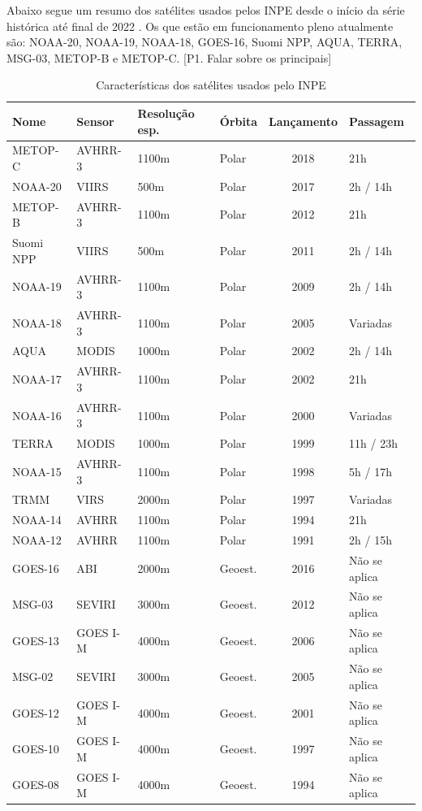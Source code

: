 \documentclass[cic,tc]{iiufrgs}
\begin{document}
Abaixo segue um resumo dos satélites usados pelos INPE desde  o início da 
série histórica até final de 2022 \cite{EmbrapaSatelites}. 
Os que estão em funcionamento pleno atualmente são:
NOAA-20, NOAA-19, NOAA-18, GOES-16, Suomi NPP, AQUA, TERRA, MSG-03, 
METOP-B e METOP-C. [P1. Falar sobre os principais]\par

\begin{table}[htbp]
\centering
\caption{Características dos satélites usados pelo INPE}
\begin{tabular}{ @{}llllcl@{} }
  \toprule
  Nome    & Sensor & Resolução esp. & Órbita & Lançamento & Passagem \\
  \midrule
  METOP-C & AVHRR-3  & 1100m       & Polar   & 2018 & 21h \\
  NOAA-20 & VIIRS    & 500m        & Polar   & 2017 & 2h / 14h \\
  METOP-B & AVHRR-3  & 1100m       & Polar   & 2012 & 21h \\
  Suomi NPP & VIIRS  & 500m        & Polar   & 2011 & 2h / 14h \\
  NOAA-19 & AVHRR-3  & 1100m       & Polar   & 2009 & 2h / 14h \\
  NOAA-18 & AVHRR-3  & 1100m       & Polar   & 2005 & Variadas \\
  AQUA    & MODIS    & 1000m       & Polar   & 2002 & 2h / 14h \\
  NOAA-17 & AVHRR-3  & 1100m       & Polar   & 2002 & 21h \\
  NOAA-16 & AVHRR-3  & 1100m       & Polar   & 2000 & Variadas \\
  TERRA   & MODIS    & 1000m       & Polar   & 1999 & 11h / 23h \\
  NOAA-15 & AVHRR-3  & 1100m       & Polar   & 1998 & 5h / 17h \\
  TRMM    & VIRS     & 2000m       & Polar   & 1997 & Variadas \\
  NOAA-14 & AVHRR    & 1100m       & Polar   & 1994 & 21h \\
  NOAA-12 & AVHRR    & 1100m       & Polar   & 1991 & 2h / 15h \\
  GOES-16 & ABI      & 2000m       & Geoest. & 2016 & Não se aplica \\
  MSG-03  & SEVIRI   & 3000m       & Geoest. & 2012 & Não se aplica \\
  GOES-13 & GOES I-M & 4000m       & Geoest. & 2006 & Não se aplica \\
  MSG-02  & SEVIRI   & 3000m       & Geoest. & 2005 & Não se aplica \\
  GOES-12 & GOES I-M & 4000m       & Geoest. & 2001 & Não se aplica \\
  GOES-10 & GOES I-M & 4000m       & Geoest. & 1997 & Não se aplica \\
  GOES-08 & GOES I-M & 4000m       & Geoest. & 1994 & Não se aplica \\
  \bottomrule
\end{tabular}
\label{table:satelites}
\end{table}
\end{document}

